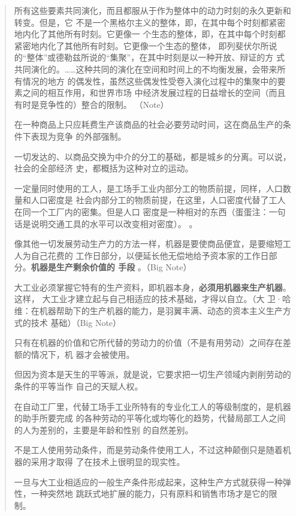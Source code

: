 \begin{quotation}
所有这些要素共同演化，而且都服从于作为整体中的动力时刻的永久更新和转变。但是，它
不是一个黑格尔主义的整体，即，在其中每个时刻都紧密地内化了其他所有时刻。它更像一
个生态的整体，即，在其中每个时刻都紧密地内化了其他所有时刻。它更像一个生态的整体，
即列斐伏尔所说的“整体”或德勒兹所说的“集聚”，在其中时刻是以一种开放、辩证的方
式共同演化的。……这种共同的演化在空间和时间上的不均衡发展，会带来所有情况的地方
的偶发性，虽然这些偶发性受卷入演化过程中的集聚中的要素之间的相互作用，和世界市场
中经济发展过程的日益增长的空间（而且有时是竞争性的）整合的限制。
 （Note）


在一种商品上只应耗费生产该商品的社会必要劳动时间，这在商品生产的条件下表现为竞争
的外部强制。

一切发达的、以商品交换为中介的分工的基础，都是城乡的分离。可以说，社会的全部经济
史，都概括为这种对立的运动。

一定量同时使用的工人，是工场手工业内部分工的物质前提，同样，人口数量和人口密度是
社会内部分工的物质前提，在这里，人口密度代替了工人在同一个工厂内的密集。但是人口
密度是一种相对的东西（蛋蛋注：一句话是说明交通工具的水平可以改变相对密度）。
。

像其他一切发展劳动生产力的方法一样，机器是要使商品便宜，是要缩短工人为自己花费的
工作日部分，以便延长他无偿地给予资本家的工作日部分。\textbf{机器是生产剩余价值的
手段} 。（Big Note）

大工业必须掌握它特有的生产资料，即机器本身，\textbf{必须用机器来生产机器}。这样，
大工业才建立起与自己相适应的技术基础，才得以自立。（大
卫·哈维：在机器帮助下的生产机器的能力，是羽翼丰满、动态的资本主义生产方式的技术
基础）（Big Note）


只有在机器的价值和它所代替的劳动力的价值（不是有用劳动）之间存在差额的情况下，机
器才会被使用。

但因为资本是天生的平等派，就是说，它要求把一切生产领域内剥削劳动的条件的平等当作
自己的天赋人权。

在自动工厂里，代替工场手工业所特有的专业化工人的等级制度的，是机器的助手所要完成
的各种劳动的平等化或均等化的趋势，代替局部工人之间的人为差别的，主要是年龄和性别
的自然差别。

不是工人使用劳动条件，而是劳动条件使用工人，不过这种颠倒只是随着机器的采用才取得
了在技术上很明显的现实性。

一旦与大工业相适应的一般生产条件形成起来，这种生产方式就获得一种弹性，一种突然地
跳跃式地扩展的能力，只有原料和销售市场才是它的限制。


\end{quotation}
